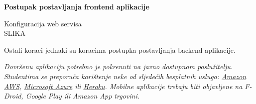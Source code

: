 \textbf{Postupak postavljanja frontend aplikacije}

\begin{packed_item}
   \item Konfiguracija web servisa \\
   
   SLIKA
   
   Ostali koraci jednaki su koracima postupka postavljanja backend aplikacije.
\end{packed_item}
			
			 \textit{Dovršenu aplikaciju potrebno je pokrenuti na javno dostupnom poslužitelju. Studentima se preporuča korištenje neke od sljedećih besplatnih usluga: \href{https://aws.amazon.com/}{Amazon AWS}, \href{https://azure.microsoft.com/en-us/}{Microsoft Azure} ili \href{https://www.heroku.com/}{Heroku}. Mobilne aplikacije trebaju biti objavljene na F-Droid, Google Play ili Amazon App trgovini.}
			
			
			\eject 